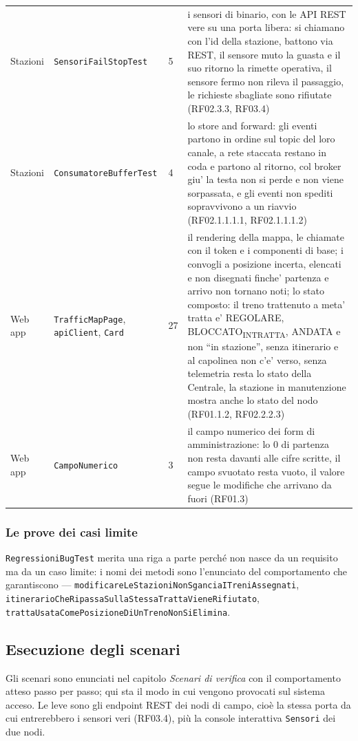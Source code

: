 \documentclass[11pt]{article}
\begin{document}
{\begin{longtable}{L{0.13\textwidth}L{0.24\textwidth}L{0.07\textwidth}L{0.42\textwidth}}
Stazioni & \texttt{SensoriFailStopTest} & 5 & i sensori di binario, con le API REST vere su una porta libera: si chiamano con l'id della stazione, battono via REST, il sensore muto la guasta e il suo ritorno la rimette operativa, il sensore fermo non rileva il passaggio, le richieste sbagliate sono rifiutate (RF02.3.3, RF03.4)\\
Stazioni & \texttt{ConsumatoreBufferTest} & 4 & lo store and forward: gli eventi partono in ordine sul topic del loro canale, a rete staccata restano in coda e partono al ritorno, col broker giu' la testa non si perde e non viene sorpassata, e gli eventi non spediti sopravvivono a un riavvio (RF02.1.1.1.1, RF02.1.1.1.2)\\
Web app & \texttt{TrafficMapPage}, \texttt{apiClient}, \texttt{Card} & 27 & il rendering della mappa, le chiamate con il token e i componenti di base; i convogli a posizione incerta, elencati e non disegnati finche' partenza e arrivo non tornano noti; lo stato composto: il treno trattenuto a meta' tratta e' REGOLARE, BLOCCATO\textsubscript{IN}\textsubscript{TRATTA}, ANDATA e non ``in stazione'', senza itinerario e al capolinea non c'e' verso, senza telemetria resta lo stato della Centrale, la stazione in manutenzione mostra anche lo stato del nodo (RF01.1.2, RF02.2.2.3)\\
Web app & \texttt{CampoNumerico} & 3 & il campo numerico dei form di amministrazione: lo 0 di partenza non resta davanti alle cifre scritte, il campo svuotato resta vuoto, il valore segue le modifiche che arrivano da fuori (RF01.3)\\
\end{longtable}}
\subsubsection{Le prove dei casi limite}
\label{sec:org5a94400}

\texttt{RegressioniBugTest} merita una riga a parte perché non nasce da un requisito ma da un caso
limite: i nomi dei metodi sono l'enunciato del comportamento che garantiscono —
\texttt{modificareLeStazioniNonSganciaITreniAssegnati}, \texttt{itinerarioCheRipassaSullaStessaTrattaVieneRifiutato},
\texttt{trattaUsataComePosizioneDiUnTrenoNonSiElimina}.
\subsection{Esecuzione degli scenari}
\label{sec:orge758338}

Gli scenari sono enunciati nel capitolo \emph{Scenari di verifica} con il comportamento atteso passo
per passo; qui sta il modo in cui vengono provocati sul sistema acceso. Le leve sono gli endpoint
REST dei nodi di campo, cioè la stessa porta da cui entrerebbero i sensori veri (RF03.4), più la
console interattiva \texttt{Sensori} dei due nodi.
\end{document}
